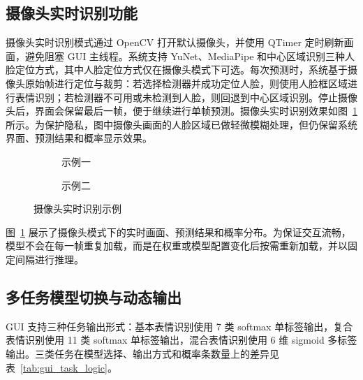 \documentclass[UTF8,a4paper,12pt]{ctexart}
\newcommand{\figplaceholder}[1]{%
  \begin{center}
    \fbox{\parbox{0.78\textwidth}{\centering #1}}
  \end{center}
}
\begin{document}
\subsection{摄像头实时识别功能}

摄像头实时识别模式通过 OpenCV 打开默认摄像头，并使用 QTimer 定时刷新画面，避免阻塞 GUI 主线程。系统支持 YuNet、MediaPipe 和中心区域识别三种人脸定位方式，其中人脸定位方式仅在摄像头模式下可选。每次预测时，系统基于摄像头原始帧进行定位与裁剪：若选择检测器并成功定位人脸，则使用人脸框区域进行表情识别；若检测器不可用或未检测到人脸，则回退到中心区域识别。停止摄像头后，界面会保留最后一帧，便于继续进行单帧预测。摄像头实时识别效果如图~\ref{fig:gui_camera_examples} 所示。为保护隐私，图中摄像头画面的人脸区域已做轻微模糊处理，但仍保留系统界面、预测结果和概率显示效果。

\begin{figure}[H]
  \centering
  \begin{subfigure}{0.48\textwidth}
    \centering
    \figplaceholder{\rule{0pt}{1.2em}}
    \caption{示例一}
  \end{subfigure}
  \hfill
  \begin{subfigure}{0.48\textwidth}
    \centering
    \figplaceholder{\rule{0pt}{1.2em}}
    \caption{示例二}
  \end{subfigure}
  \caption{摄像头实时识别示例}
  \label{fig:gui_camera_examples}
\end{figure}

图~\ref{fig:gui_camera_examples} 展示了摄像头模式下的实时画面、预测结果和概率分布。为保证交互流畅，模型不会在每一帧重复加载，而是在权重或模型配置变化后按需重新加载，并以固定间隔进行推理。

\subsection{多任务模型切换与动态输出}

GUI 支持三种任务输出形式：基本表情识别使用 7 类 softmax 单标签输出，复合表情识别使用 11 类 softmax 单标签输出，混合表情识别使用 6 维 sigmoid 多标签输出。三类任务在模型选择、输出方式和概率条数量上的差异见表~\ref{tab:gui_task_logic}。
\end{document}
